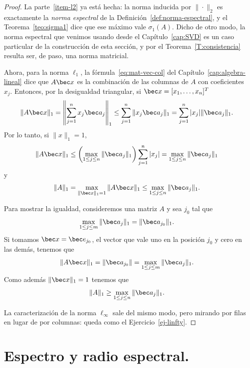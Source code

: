 \begin{proof}
La parte~\ref{item-l2} ya está hecha: la norma inducida por $\|\cdot\|_2$ es
exactamente la \emph{norma espectral} de la
Definición~\ref{def:norma-espectral}, y el Teorema~\ref{teo:sigma1} dice que
ese máximo vale $\sigma_1(A)$. Dicho de otro modo, la norma espectral que
venimos usando desde el Capítulo~\ref{cap:SVD} es un caso particular de la
construcción de esta sección, y por el Teorema~\ref{T:consistencia} resulta
ser, de paso, una norma matricial.

Ahora, para la norma $\ell_1$, la fórmula~\eqref{eq:mat-vec-col} del
Capítulo~\ref{cap:algebra-lineal} dice que $A\bec x$ es la combinación de las
columnas de $A$ con coeficientes $x_j$. Entonces, por la desigualdad
triangular, si $\bec x = [x_1,\dots,x_n]^T$
\begin{equation*}
    \|A\bec x\|_1 = \left\|\sum_{j=1}^n x_j \bec a_j\right\|_1 \leq \sum_{j=1}^n \| x_j \bec a_j\|_1 = \sum_{j=1}^n |x_j|\| \bec a_j\|_1.
\end{equation*}
Por lo tanto, si $\|x\|_1 = 1$,
\begin{equation*}
     \|A\bec x\|_1 \leq \left(\max_{1\leq j\leq n}\| \bec a_j\|_1\right) \sum_{j=1}^n |x_j|  = \max_{1\leq j\leq n}\| \bec a_j\|_1
\end{equation*}
y
\begin{equation*}
    \|A\|_1 = \max_{\|\bec x\|_1 = 1}\|A\bec x\|_1 \leq \max_{1\leq j\leq n}\| \bec a_j\|_1. 
\end{equation*}

Para mostrar la igualdad, consideremos una matriz $A$ y sea $j_0$ tal que 
\[\max_{1\leq j \leq m}\|\bec a_j\|_1 = \|\bec a_{j_0}\|_1.\]
Si tomamos $\bec x = \bec e_{j_0}$, el vector que vale  uno en la posición $j_0$ y cero en las demás, tenemos que
\[\|A\bec x\|_1 = \|\bec a_{j_0}\| = \max_{1\leq j \leq m}\|\bec a_j\|_1.\]
Como además $\|\bec x\|_1 = 1$ tenemos que 
\begin{equation*}
    \|A\|_1 \geq \max_{1\leq j\leq n}\| \bec a_j\|_1. 
\end{equation*}

La caracterización de la norma $\ell_\infty$ sale del mismo modo, pero mirando
por filas en lugar de por columnas: queda como el
Ejercicio~\ref{ej-linfty}.
\end{proof}

\section{Espectro y radio espectral.}

